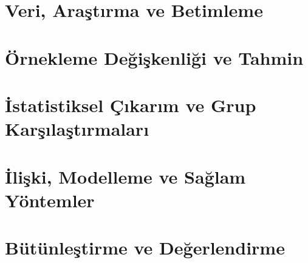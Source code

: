 \documentclass[10pt,twoside,openright]{book}
\def\EbookBuild{1}
\theoremstyle{definition}
\theoremstyle{plain}
\begin{document}
\frontmatter

\cleardoublepage
\tableofcontents
\cleardoublepage
\listoffigures
\cleardoublepage
\listoftables
\cleardoublepage





\cleardoublepage

\mainmatter
\part{Veri, Araştırma ve Betimleme}





\part{Örnekleme Değişkenliği ve Tahmin}






\part{İstatistiksel Çıkarım ve Grup Karşılaştırmaları}




\part{İlişki, Modelleme ve Sağlam Yöntemler}








\part{Bütünleştirme ve Değerlendirme}


\appendix





\backmatter


\cleardoublepage
{}
{}
\printindex

\cleardoublepage
\ifdefined\EbookBuild
  
\fi
\end{document}
